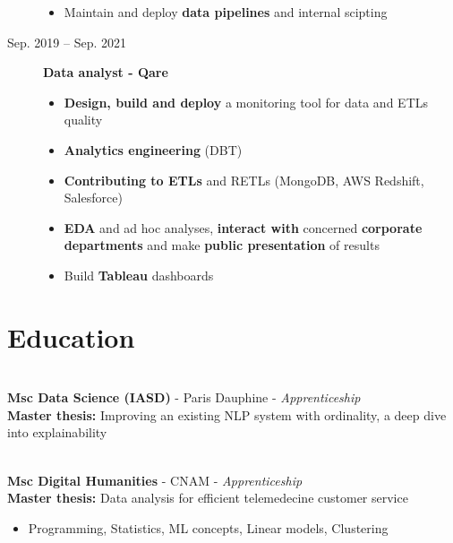 \documentclass[a4paper,10pt]{article}
\begin{document}
\begin{adjustbox}{valign=t}
\begin{minipage}{0.6\textwidth}
\begin{description}
\begin{itemize}[topsep=0pt]
                    \item Maintain and deploy \textbf{data pipelines} and internal scipting
                \end{itemize}
                \normalsize
            \item[\normalfont \textcolor{ColorOne}{Sep. 2019 -- Sep. 2021}]
                \textbf{Data analyst - Qare}\\
                \small
                \begin{itemize}[topsep=0pt]
                    \item \textbf{Design, build and deploy} a monitoring tool for data and ETLs quality
                    \item \textbf{Analytics engineering} (DBT)
                    \item \textbf{Contributing to ETLs} and RETLs (MongoDB, AWS Redshift, Salesforce)
                    \item \textbf{EDA} and ad hoc analyses, \textbf{interact with} concerned \textbf{corporate departments} and make \textbf{public presentation} of results
                    \item Build \textbf{Tableau} dashboards
                \end{itemize}
                \normalsize
        \end{description}
        \vspace{-1cm}
        \section*{Education}
        \vspace{-.3cm}
        \begin{description}
            \raggedright
            \item [\normalfont \textcolor{ColorOne}{2021 -- 2022}]~\\
                  \textbf{Msc Data Science (IASD)} - Paris Dauphine - \textit{Apprenticeship}\\
                  \quad \textbf{Master thesis:} Improving an existing NLP system with ordinality, a deep dive into explainability
            \item [\normalfont \textcolor{ColorOne}{2019 -- 2021}]~\\
                  \textbf{Msc Digital Humanities} - CNAM - \textit{Apprenticeship}\\
                  \quad \textbf{Master thesis:} Data analysis for efficient telemedecine customer service\\
                  \small
                  \begin{itemize}[topsep=0pt]
                      \item Programming, Statistics, ML concepts, Linear models, Clustering\\[.2cm]
                  \end{itemize}
                  \normalsize


\end{description}
\end{minipage}
\end{adjustbox}
\end{document}

